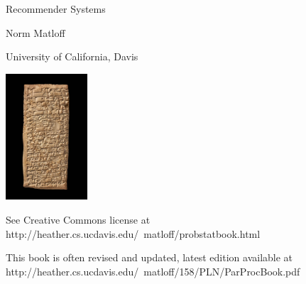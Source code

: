 \pagecolor{yellow}
\color{black}

\bigskip

\begin{center}
{\Huge Recommender Systems}

{\LARGE Norm Matloff 

\medskip

University of California, Davis}

\bigskip

\vspace{0.5in}


\vspace{1in}


   \includegraphics[width=1.2in]{Images/AncientYelp.jpg}

\end{center}

\vspace{1.5in}

See Creative Commons license at 
{http://heather.cs.ucdavis.edu/~matloff/probstatbook.html} 

This book is often revised and updated, latest edition available at
{http://heather.cs.ucdavis.edu/~matloff/158/PLN/ParProcBook.pdf} 

